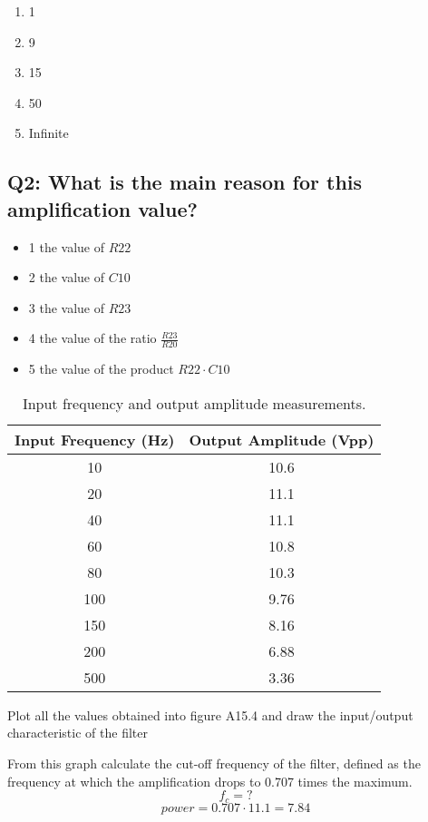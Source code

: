 \begin{enumerate}
    \item 1
    \item 9
    \item 15
    \item 50
    \item Infinite
\end{enumerate}

\subsection{Q2: What is the main reason for this amplification value?}
\begin{itemize}
    \item 1 the value of $R22$
    \item 2 the value of $C10$
    \item 3 the value of $R23$
    \item 4 the value of the ratio $\frac{R23}{R20}$
    \item 5 the value of the product $R22 \cdot C10$
\end{itemize}


\begin{table}[H]
    \centering
    \begin{tabular}{|c|c|}
        \hline
        \textbf{Input Frequency (Hz)} & \textbf{Output Amplitude (Vpp)} \\
        \hline
        10 & 10.6 \\
        20 & 11.1 \\
        40 & 11.1 \\
        60 & 10.8 \\
        80 & 10.3 \\
        100 & 9.76 \\
        150 & 8.16 \\
        200 & 6.88 \\
        500 & 3.36\\
        \hline
    \end{tabular}
    \caption{Input frequency and output amplitude measurements.}
    \label{table:A15.1}
\end{table}

Plot all the values obtained into figure A15.4 and draw the
input/output characteristic of the filter

From this graph calculate the cut-off frequency of the filter, defined
as the frequency at which the amplification drops to 0.707 times the
maximum. 
$$ f_c = ? $$
$$ power = 0.707 \cdot 11.1 = 7.84 $$

